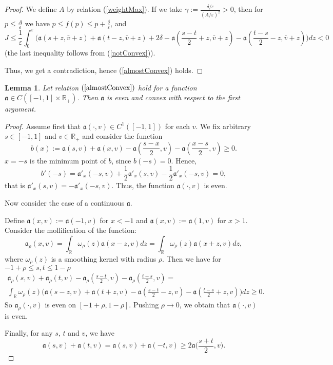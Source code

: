 \documentclass[12pt]{article}
\newcommand{\Real}{\mathbb R}
\newcommand{\eps}{\varepsilon}
\renewcommand{\ge}{\geqslant}
\renewcommand{\le}{\leqslant}
\newtheorem{lm}{Lemma}
\begin{document}
\begin{proof}
We define $A$ by relation (\ref{weightMax}).
If we take $\gamma := \frac{\delta / \eps}{(A / \eps)^2} > 0$,
then for $p \le \frac{A}{\eps}$ we have $p \le f( p ) \le p + \frac{\delta}{\eps}$, and
\begin{equation*}
J \le \frac{1}{\eps} \int_0^{\eps} \big( \mathfrak a(s + z, \bar{v} + z) + \mathfrak a(t - z, \bar{v} + z) + 2 \delta
- \mathfrak a(\frac{s - t}{2} + z, \bar{v} + z) - \mathfrak a(\frac{t - s}{2} - z, \bar{v} + z) \big) dz < 0
\end{equation*}
(the last inequality follows from (\ref{notConvex})).

Thus, we get a contradiction, hence (\ref{almostConvex}) holds.
\end{proof}

\begin{lm}
Let relation $(\ref{almostConvex})$ hold for a function $\mathfrak a \in C([-1, 1] \times \Real_+)$.
Then $\mathfrak a$ is even and convex with respect to the first argument.
\end{lm}

\begin{proof}
Assume first that $\mathfrak a(\cdot, v) \in C^1([-1, 1])$ for each $v$.
We fix arbitrary $s \in [-1, 1]$ and $v \in \Real_+$ and consider the function
$$b(x) := \mathfrak a( s, v ) + \mathfrak a( x, v ) - \mathfrak a( \frac{ s - x }{2}, v ) - \mathfrak a( \frac{ x - s }{2}, v ) \ge 0.$$
$x = -s$ is the minimum point of $b$, since $b(-s) = 0$.
Hence,
$$b'(-s) = \mathfrak a'_x( -s, v ) + \frac{1}{2} \mathfrak a'_x( s, v ) - \frac{1}{2} \mathfrak a'_x( -s, v ) = 0,$$
that is $\mathfrak a'_x( s, v ) = -\mathfrak a'_x( -s, v )$. Thus, the function $\mathfrak a(\cdot, v)$ is even.

Now consider the case of a continuous $\mathfrak a$.

Define $\mathfrak a( x, v ) := \mathfrak a( -1, v )$ for $x < -1$ and $\mathfrak a( x, v ) := \mathfrak a( 1, v )$ for $x > 1$.
Consider the mollification of the function:
$$\mathfrak a_\rho( x, v ) = \int_\Real \omega_\rho ( z ) \mathfrak a( x - z, v ) dz = \int_\Real \omega_\rho ( z ) \mathfrak a( x + z, v ) dz,$$
where $\omega_\rho(z)$ is a smoothing kernel with radius $\rho$.
Then we have for $-1+\rho\le s,t \le 1-\rho$
\begin{multline*}
\mathfrak a_\rho( s, v ) + \mathfrak a_\rho( t, v ) - \mathfrak a_\rho( \frac{ s - t }{2}, v ) - \mathfrak a_\rho( \frac{ t - s }{2}, v ) =
\\ \int_\Real \omega_\rho ( z ) \big( \mathfrak a( s - z, v ) + \mathfrak a( t + z, v ) - \mathfrak a( \frac{ s - t }{2} - z, v ) - \mathfrak a( \frac{ t - s }{2} + z, v ) \big) dz \ge 0.
\end{multline*}
So $\mathfrak a_\rho(\cdot, v)$ is even on $[-1+\rho, 1-\rho]$.
Pushing $\rho \to 0$, we obtain that $\mathfrak a(\cdot, v)$ is even.

Finally, for any $s$, $t$ and $v$, we have
$$\mathfrak a( s, v ) + \mathfrak a( t, v ) = \mathfrak a( s, v ) + \mathfrak a( -t, v ) \ge 2 \mathfrak a\big( \frac{ s + t }{2}, v \big).$$
\end{proof}
\end{document}
